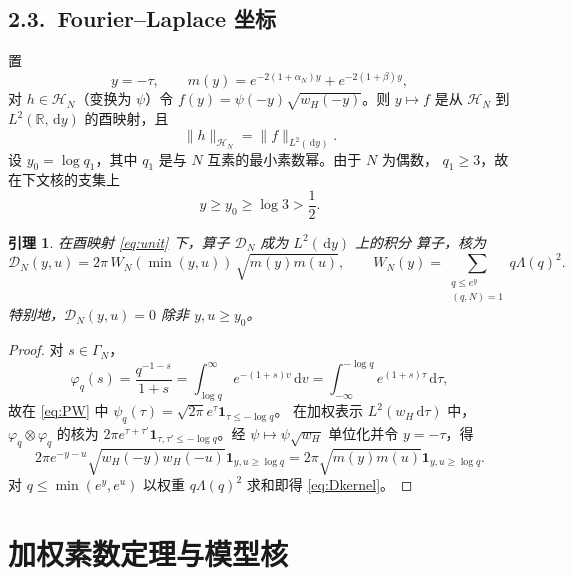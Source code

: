 \documentclass[12pt,a4paper]{amsart}
\numberwithin{equation}{section}
\theoremstyle{plain}
\newtheorem{lemma}[theorem]{引理}
\theoremstyle{definition}
\newcommand{\dd}{\,\mathrm{d}}
\begin{document}
\subsection*{2.3.\ Fourier--Laplace 坐标}

置
\begin{equation}\label{eq:m}
 y=-\tau,\qquad m(y)=e^{-2(1+\alpha_N)y}+e^{-2(1+\beta)y},
\end{equation}
对 $h\in\mathcal H_N$（变换为 $\psi$）令 $f(y)=\psi(-y)\sqrt{w_H(-y)}$。则
$y\mapsto f$ 是从 $\mathcal H_N$ 到 $L^2(\mathbb R,\dd y)$ 的酉映射，且
\begin{equation}\label{eq:unit}
 \|h\|_{\mathcal H_N}=\|f\|_{L^2(\dd y)} .
\end{equation}
设 $y_0=\log q_1$，其中 $q_1$ 是与 $N$ 互素的最小素数幂。由于 $N$ 为偶数，
$q_1\ge3$，故在下文核的支集上
\begin{equation}\label{eq:y0}
 y\ge y_0\ge\log3>\frac12 .
\end{equation}

\begin{lemma}\label{lem:FL}
在酉映射 \eqref{eq:unit} 下，算子 $\mathcal D_N$ 成为 $L^2(\dd y)$ 上的积分
算子，核为
\begin{equation}\label{eq:Dkernel}
 \mathscr D_N(y,u)=2\pi\,W_N(\min(y,u))\,\sqrt{m(y)m(u)},
 \qquad
 W_N(y)=\sum_{\substack{q\le e^y\\(q,N)=1}}q\Lambda(q)^2 .
\end{equation}
特别地，$\mathscr D_N(y,u)=0$ 除非 $y,u\ge y_0$。
\end{lemma}

\begin{proof}
对 $s\in\Gamma_N$，
\[
 \varphi_q(s)=\frac{q^{-1-s}}{1+s}=\int_{\log q}^{\infty}e^{-(1+s)v}\dd v
 =\int_{-\infty}^{-\log q}e^{(1+s)\tau}\dd\tau,
\]
故在 \eqref{eq:PW} 中 $\psi_q(\tau)=\sqrt{2\pi}e^{\tau}\mathbf 1_{\tau\le-\log q}$。
在加权表示 $L^2(w_H\dd\tau)$ 中，$\varphi_q\otimes\varphi_q$ 的核为
$2\pi e^{\tau+\tau'}\mathbf 1_{\tau,\tau'\le-\log q}$。经 $\psi\mapsto\psi\sqrt{w_H}$
单位化并令 $y=-\tau$，得
\[
 2\pi e^{-y-u}\sqrt{w_H(-y)w_H(-u)}\mathbf 1_{y,u\ge\log q}
 =2\pi\sqrt{m(y)m(u)}\mathbf 1_{y,u\ge\log q} .
\]
对 $q\le\min(e^y,e^u)$ 以权重 $q\Lambda(q)^2$ 求和即得 \eqref{eq:Dkernel}。
\end{proof}

\section{加权素数定理与模型核}\label{sec:pnt}
\end{document}
